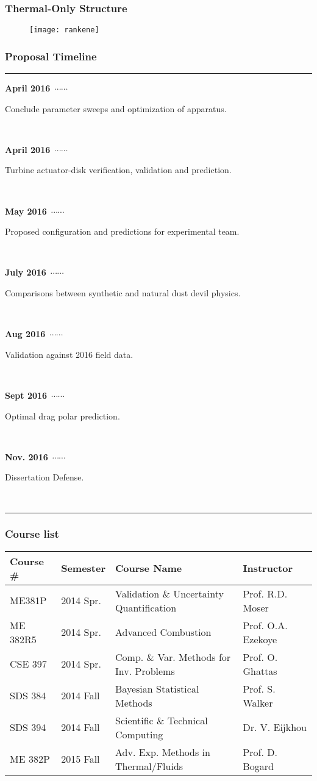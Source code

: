 \documentclass[mathserif]{beamer}
\newcommand\ytl[2]{
\parbox[b]{8em}{\hfill{\color{black}\bfseries\sffamily
#1}~$\cdots\cdots$~}\makebox[0pt][c]{$\bullet$}\vrule\quad
\parbox[c]{8.5cm}{\vspace{7pt}\color{black}\raggedright\sffamily
#2.\\[7pt]}\\[-3pt]}
\newcommand\yto[2]{
\parbox[b]{8em}{\hfill{\color{orange}\bfseries\sffamily
#1}~$\cdots\cdots$~}\makebox[0pt][c]{$\bullet$}\vrule\quad
\parbox[c]{8.5cm}{\vspace{7pt}\color{orange}\raggedright\sffamily
#2.\\[7pt]}\\[-3pt]}
\newcommand\ytb[2]{
\parbox[b]{8em}{\hfill{\color{blue}\bfseries\sffamily
#1}~$\cdots\cdots$~}\makebox[0pt][c]{$\bullet$}\vrule\quad
\parbox[c]{8.5cm}{\vspace{7pt}\color{blue}\raggedright\sffamily
#2.\\[7pt]}\\[-3pt]}
\begin{document}
%
%
%
\begin{frame}
\frametitle{Thermal-Only Structure}

    \begin{figure}[htb]
     \centering
     \texttt{[image: rankene]}
    \end{figure}
\end{frame}

%
%
%
\begin{frame}
\frametitle{Proposal Timeline}
\small
\begin{center}
\begin{table}
\centering
\begin{minipage}[t]{1.6\linewidth}
\color{black}
 \rule{\linewidth}{1pt}
 \yto{April 2016}{Conclude parameter sweeps and optimization of apparatus}
 \yto{April 2016}{Turbine actuator-disk verification, validation and prediction}
 \ytl{May 2016}{Proposed configuration and predictions for experimental
 team}
 \ytb{July 2016}{Comparisons between synthetic and natural dust devil physics}
 \ytl{Aug 2016}{Validation against 2016 field data}
 \ytl{Sept 2016}{Optimal drag polar prediction}
\ytl{Nov. 2016}{Dissertation Defense}
 \bigskip
 \rule{\linewidth}{1pt}%
\end{minipage}%
\end{table}
 \label{tab:prop}
\end{center}

\end{frame}


%
%
%
\begin{frame}
 \frametitle{Course list}
 \footnotesize
 \begin{table}[h]
  \centering
  \begin{tabular}{llll}
   \hline \hline
   Course \# & Semester & Course Name & Instructor \\ 
   \hline 
   ME381P   & 2014 Spr.   & Validation \& Uncertainty Quantification &
	       Prof. R.D. Moser \\
   ME 382R5 & 2014 Spr.   & Advanced Combustion & Prof. O.A. Ezekoye \\
   CSE 397  & 2014 Spr.   &  Comp. \& Var. Methods for
	   Inv. Problems & Prof. O. Ghattas \\
   SDS 384  & 2014 Fall   & Bayesian Statistical Methods & Prof. S.
	       Walker \\
   SDS 394  & 2014 Fall   & Scientific \& Technical Computing & Dr. V. Eijkhou \\
   ME 382P  & 2015 Fall   & Adv. Exp. Methods in Thermal/Fluids
	   & Prof. D. Bogard \\  
   \hline \hline
  \end{tabular} 
 \end{table}

\end{frame}
\end{document}
